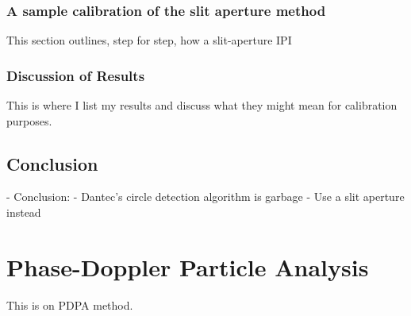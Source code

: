 \documentclass[10pt]{book}
\begin{document}
\subsection{A sample calibration of the slit aperture method}
This section outlines, step for step, how a slit-aperture IPI

\subsection{Discussion of Results}
This is where I list my results and discuss what they might mean for
calibration purposes.

\section{Conclusion}
- Conclusion:
    - Dantec's circle detection algorithm is garbage
    - Use a slit aperture instead

\chapter{Phase-Doppler Particle Analysis}
This is on PDPA method.
\end{document}
